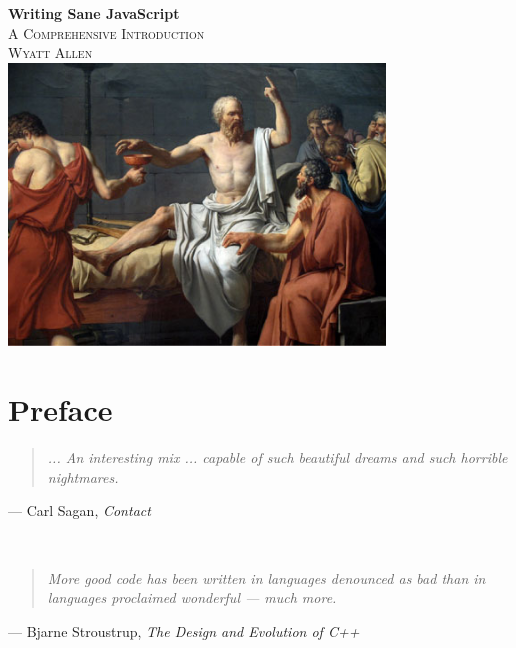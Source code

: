 \documentclass[11pt,letter]{book}
\begin{document}
    \frontmatter

    \begin{titlepage}
        \begin{center}
            { \huge \bfseries Writing Sane JavaScript}\\[0.4cm]
            \textsc{\Large A Comprehensive Introduction}\\[0.5cm]
            \textsc{Wyatt Allen}
            \HRule \\[1.2cm]
            \includegraphics[width=10cm]{socrates-hemlock}
            \vfill
        \end{center}
    \end{titlepage}
    
    \tableofcontents 
    
    \chapter{Preface}
    \begin{quote}
        \emph{
            ... An interesting mix ... capable of such beautiful dreams and such horrible 
            nightmares.
        }
    \end{quote}
    \begin{flushright}
        --- Carl Sagan, \emph{Contact}
    \end{flushright}
    \HRule \\[1.2cm]
	
	\begin{quote}
        \emph{
            More good code has been written in languages denounced as bad than in languages 
			proclaimed wonderful --- much more.
        }
    \end{quote}
    \begin{flushright}
        --- Bjarne Stroustrup, \emph{The Design and Evolution of C++}
    \end{flushright}
    \HRule \\[1.2cm]
    
\end{document}
